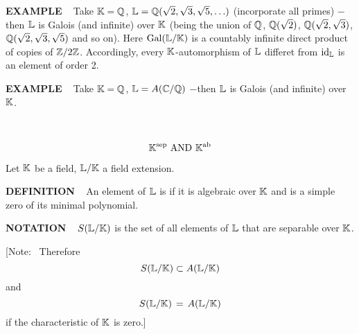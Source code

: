 \vspace{0.1cm}

\begin{x}{\small\bf EXAMPLE} \ %
Take $\mathbb{K} = \mathbb{Q}$, $\mathbb{L} =\mathbb{Q}(\sqrt{2},\sqrt{3},\sqrt{5}, \ldots)$ (incorporate all primes) $-$then $\mathbb{L}$ is Galois 
(and infinite) over $\mathbb{K}$ (being the union of 
$\mathbb{Q}$, 
$\mathbb{Q}(\sqrt{2})$, 
$\mathbb{Q}(\sqrt{2},\sqrt{3})$, 
$\mathbb{Q}(\sqrt{2},\sqrt{3},\sqrt{5})$ 
and so on).  Here $\text{Gal}(\mathbb{L} / \mathbb{K})$ is a countably infinite direct product of copies of $\mathbb{Z} / 2\mathbb{Z}$.  
Accordingly, every $\mathbb{K}$-automorphism of $\mathbb{L}$ differet from $\text{id}_{\mathbb{L}}$ is an element of order 2.
\end{x}

\vspace{0.1cm}

\begin{x}{\small\bf EXAMPLE} \ %
Take $\mathbb{K} = \mathbb{Q}$, $\mathbb{L} = A(\mathbb{C} / \mathbb{Q})$ $-$then $\mathbb{L}$ is Galois (and infinite) over $\mathbb{K}$.
\end{x}





\setcounter{theoremn}{0}

\newpage

\ \indent 

\[
\text{$\mathbb{K}^{\text{sep}}$ AND $\mathbb{K}^{\text{ab}}$}
\]

Let $\mathbb{K}$ be a field, $\mathbb{L}/\mathbb{K}$ a field extension.

\vspace{0.3cm}

\begin{x}{\small\bf DEFINITION} \ %
An element of $\mathbb{L}$ is 
if it is algebraic over $\mathbb{K}$ and is a simple zero of its minimal polynomial.
\end{x}

\vspace{0.1cm}


\begin{x}{\small\bf NOTATION} \ %
$S(\mathbb{L}/\mathbb{K})$ is the set of all elements of $\mathbb{L}$ that are separable over $\mathbb{K}$.

\vspace{0.1cm}

[Note: \ Therefore
\[
S(\mathbb{L}/\mathbb{K}) \subset A(\mathbb{L}/\mathbb{K})
\]
and 
\[
S(\mathbb{L}/\mathbb{K}) \hspace{0.05cm} = \hspace{0.05cm} A(\mathbb{L}/\mathbb{K})
\]
if the characteristic of $\mathbb{K}$ is zero.]
\end{x}

